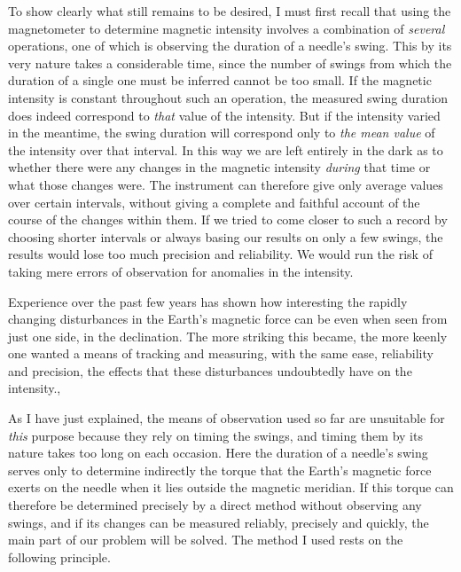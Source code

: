To show clearly what still remains to be desired, I must first recall that using the magnetometer to determine magnetic intensity involves a combination of \textit{several} operations, one of which is observing the duration of a needle’s swing. This by its very nature takes a considerable time, since the number of swings from which the duration of a single one must be inferred cannot be too small. If the magnetic intensity is constant throughout such an operation, the measured swing duration does indeed correspond to \textit{that} value of the intensity. But if the intensity varied in the meantime, the swing duration will correspond only to \textit{the mean value} of the intensity over that interval. In this way we are left entirely in the dark as to whether there were any changes in the magnetic intensity \textit{during} that time or what those changes were. The instrument can therefore give only average values over certain intervals, without giving a complete and faithful account of the course of the changes within them. If we tried to come closer to such a record by choosing shorter intervals or always basing our results on only a few swings, the results would lose too much precision and reliability. We would run the risk of taking mere errors of observation for anomalies in the intensity.

Experience over the past few years has shown how interesting the rapidly changing disturbances in the Earth’s magnetic force can be even when seen from just one side, in the declination. The more striking this became, the more keenly one wanted a means of tracking and measuring, with the same ease, reliability and precision, the effects that these disturbances undoubtedly have on the intensity.,

As I have just explained, the means of observation used so far are unsuitable for \textit{this} purpose because they rely on timing the swings, and timing them by its nature takes too long on each occasion. Here the duration of a needle’s swing serves only to determine indirectly the torque that the Earth’s magnetic force exerts on the needle when it lies outside the magnetic meridian. If this torque can therefore be determined precisely by a direct method without observing any swings, and if its changes can be measured reliably, precisely and quickly, the main part of our problem will be solved. The method I used rests on the following principle.


